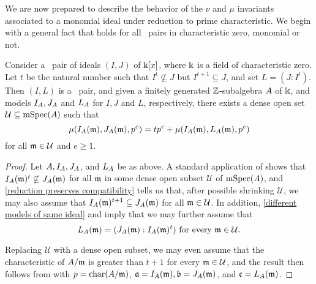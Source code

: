 \documentclass{amsart}
\begin{document}
We are now prepared to describe the behavior of the $\nu$ and $\mu$ invariants associated to a monomial ideal under reduction to prime characteristic.  We begin with a general fact that holds for all \compatible\ pairs in characteristic zero, monomial or not.

\begin{proposition}
\label{general-compatible->smalll: P}
  Consider a \compatible\ pair of ideals $(I,J)$ of $\Bbbk[x]$, where $\Bbbk$ is a field of characteristic zero. Let $t$ be the natural number such that $I^t \not \subseteq J$ but $I^{t+1} \subseteq J$, and set $L=(J: I^t)$.  Then $(I,L)$ is a \smallcompatible\ pair, and given a finitely generated $\mathbb{Z}$-subalgebra $A$ of $\Bbbk$, and models $I_A, J_A$ and $L_A$ for $I,J$ and $L$, respectively, there exists a dense open set $\mathcal{U} \subseteq \operatorname{mSpec}(A)$ such that
%
\[ \mu(I_A(\mathfrak{m}), J_A(\mathfrak{m}), p^e) = t p^e + \mu(I_A(\mathfrak{m}), L_A(\mathfrak{m}), p^e) \] 
%
for all $\mathfrak{m} \in \mathcal{U}$ and $e \geq 1$.
\end{proposition}

\begin{proof}   Let $A, I_A, J_A$, and $L_A$ be as above.  A standard application of  shows that $I_A(\mathfrak{m})^t \not \subseteq J_A(\mathfrak{m})$ for all $\mathfrak{m}$ in some dense open subset $\mathcal{U}$ of $\operatorname{mSpec}(A)$, and \ref{reduction preserves compatibility} tells us that, after possible shrinking $\mathcal{U}$, we may also assume that $I_A(\mathfrak{m})^{t+1} \subseteq J_A(\mathfrak{m})$ for all $\mathfrak{m} \in \mathcal{U}$. In addition,  \ref{different models of same ideal}
 and  imply that we may further assume that 
 \[ L_A(\mathfrak{m}) = (J_A(\mathfrak{m}) : I_A(\mathfrak{m})^t) \text{ for every $\mathfrak{m} \in \mathcal{U}$}. \] 
 
 Replacing $\mathcal{U}$ with a dense open subset, we may even assume that the characteristic of $A/\mathfrak{m}$ is greater than $t+1$ for every $\mathfrak{m} \in \mathcal{U}$, and the result then follows from  with $p = \operatorname{char}(A/\mathfrak{m})$, $\mathfrak{a} = I_A(\mathfrak{m}), \mathfrak{b} = J_A(\mathfrak{m})$, and $\mathfrak{c} = L_A(\mathfrak{m})$.
 \end{proof}
\end{document}
